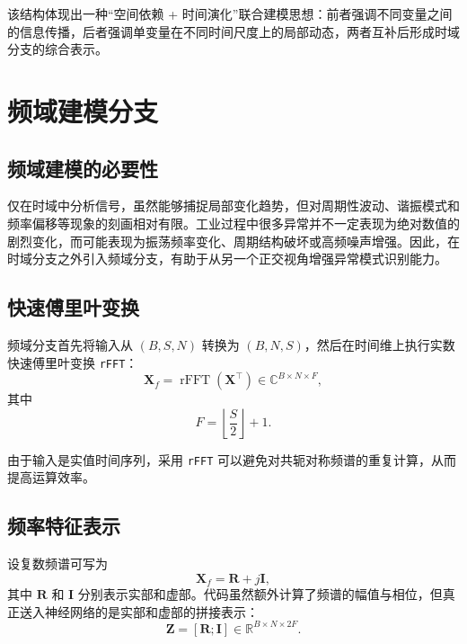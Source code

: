 该结构体现出一种“空间依赖 + 时间演化”联合建模思想：前者强调不同变量之间的信息传播，后者强调单变量在不同时间尺度上的局部动态，两者互补后形成时域分支的综合表示。

\section{频域建模分支}

\subsection{频域建模的必要性}

仅在时域中分析信号，虽然能够捕捉局部变化趋势，但对周期性波动、谐振模式和频率偏移等现象的刻画相对有限。工业过程中很多异常并不一定表现为绝对数值的剧烈变化，而可能表现为振荡频率变化、周期结构破坏或高频噪声增强。因此，在时域分支之外引入频域分支，有助于从另一个正交视角增强异常模式识别能力。

\subsection{快速傅里叶变换}

频域分支首先将输入从 $(B,S,N)$ 转换为 $(B,N,S)$，然后在时间维上执行实数快速傅里叶变换 \texttt{rFFT}：
\begin{equation}
    \mathbf{X}_f = \operatorname{rFFT}(\mathbf{X}^{\top})
    \in \mathbb{C}^{B \times N \times F},
\end{equation}
其中
\begin{equation}
    F = \left\lfloor \frac{S}{2} \right\rfloor + 1.
\end{equation}

由于输入是实值时间序列，采用 \texttt{rFFT} 可以避免对共轭对称频谱的重复计算，从而提高运算效率。

\subsection{频率特征表示}

设复数频谱可写为
\begin{equation}
    \mathbf{X}_f = \mathbf{R} + j\mathbf{I},
\end{equation}
其中 $\mathbf{R}$ 和 $\mathbf{I}$ 分别表示实部和虚部。代码虽然额外计算了频谱的幅值与相位，但真正送入神经网络的是实部和虚部的拼接表示：
\begin{equation}
    \mathbf{Z} = [\mathbf{R}; \mathbf{I}] \in \mathbb{R}^{B \times N \times 2F}.
\end{equation}

